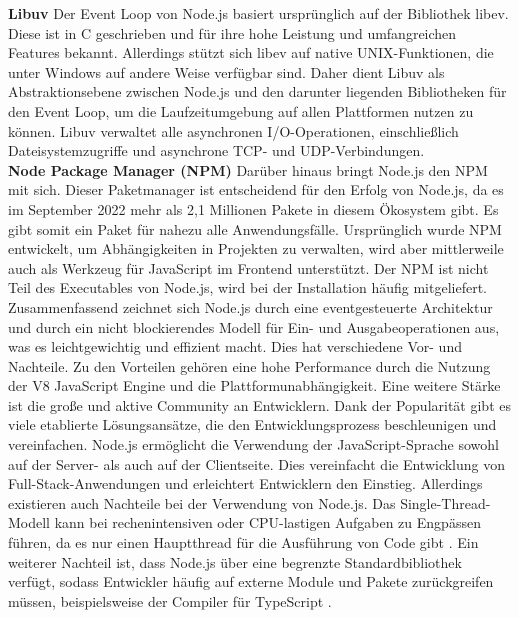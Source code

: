 \noindent
\textbf{Libuv} \newline
Der Event Loop von Node.js basiert ursprünglich auf der Bibliothek libev. Diese ist in C geschrieben und für ihre hohe Leistung und umfangreichen Features bekannt. Allerdings stützt sich libev auf native UNIX-Funktionen, die unter Windows auf andere Weise verfügbar sind. Daher dient Libuv als Abstraktionsebene zwischen Node.js und den darunter liegenden Bibliotheken für den Event Loop, um die Laufzeitumgebung auf allen Plattformen nutzen zu können. Libuv verwaltet alle asynchronen I/O-Operationen, einschließlich Dateisystemzugriffe und asynchrone TCP- und UDP-Verbindungen.\cite{Springer.2022} \\

\noindent
\textbf{Node Package Manager (NPM)} \newline
Darüber hinaus bringt Node.js den NPM mit sich. Dieser Paketmanager ist entscheidend für den Erfolg von Node.js, da es im September 2022 mehr als 2,1 Millionen Pakete in diesem Ökosystem gibt. Es gibt somit ein Paket für nahezu alle Anwendungsfälle. Ursprünglich wurde NPM entwickelt, um Abhängigkeiten in Projekten zu verwalten, wird aber mittlerweile auch als Werkzeug für JavaScript im Frontend unterstützt. Der NPM ist nicht Teil des Executables von Node.js, wird bei der Installation häufig mitgeliefert. \cite{Springer.2022, OpenJSFoundation.2022}\\

\noindent
Zusammenfassend zeichnet sich Node.js durch eine eventgesteuerte Architektur und durch ein nicht blockierendes Modell für Ein- und Ausgabeoperationen aus, was es leichtgewichtig und effizient macht. Dies hat verschiedene Vor- und Nachteile. \newline
Zu den Vorteilen gehören eine hohe Performance durch die Nutzung der V8 JavaScript Engine und die Plattformunabhängigkeit. Eine weitere Stärke ist die große und aktive Community an Entwicklern. Dank der Popularität gibt es viele etablierte Lösungsansätze, die den Entwicklungsprozess beschleunigen und vereinfachen. Node.js ermöglicht die Verwendung der JavaScript-Sprache sowohl auf der Server- als auch auf der Clientseite. Dies vereinfacht die Entwicklung von Full-Stack-Anwendungen und erleichtert Entwicklern den Einstieg.\cite{Brown.November2019, OpenJSFoundation.2022b} \newline
Allerdings existieren auch Nachteile bei der Verwendung von Node.js. Das Single-Thread-Modell kann bei rechenintensiven oder CPU-lastigen Aufgaben zu Engpässen führen, da es nur einen Hauptthread für die Ausführung von Code gibt  \cite{Chhetri.2016}. Ein weiterer Nachteil ist, dass Node.js über eine begrenzte Standardbibliothek verfügt, sodass Entwickler häufig auf externe Module und Pakete zurückgreifen müssen, beispielsweise der Compiler für TypeScript \cite{OpenJSFoundation.2022b}.

